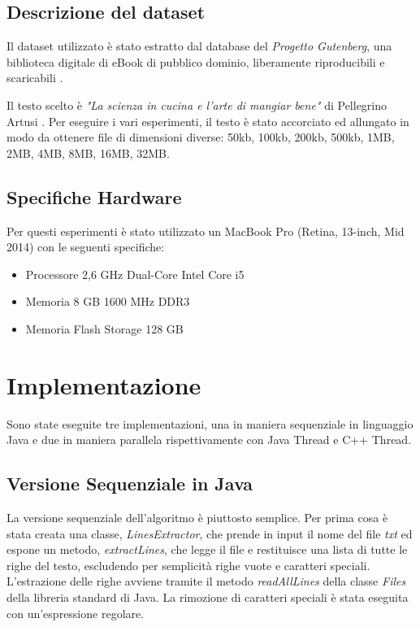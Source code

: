 \documentclass[10pt,twocolumn,letterpaper]{article}
\begin{document}
\subsection{Descrizione del dataset}
Il dataset utilizzato è stato estratto dal database del \textit{Progetto Gutenberg}, una biblioteca digitale di eBook di pubblico dominio, liberamente riproducibili e scaricabili \cite{GUTENBERG}. 

Il testo scelto è \textit{"La scienza in cucina e l'arte di mangiar bene"} di Pellegrino Artusi \cite{ARTUSI}. Per eseguire i vari esperimenti, il testo è stato accorciato ed allungato in modo da ottenere file di dimensioni diverse: 50kb, 100kb, 200kb, 500kb, 1MB, 2MB, 4MB, 8MB, 16MB, 32MB.

\subsection{Specifiche Hardware}
Per questi esperimenti è stato utilizzato un MacBook Pro (Retina, 13-inch, Mid 2014) con le seguenti specifiche:
\begin{itemize}
	\item Processore 2,6 GHz Dual-Core Intel Core i5
	\item Memoria 8 GB 1600 MHz DDR3
	\item Memoria Flash Storage 128 GB
\end{itemize}

\section{Implementazione}
Sono state eseguite tre implementazioni, una in maniera sequenziale in linguaggio Java e due in maniera parallela rispettivamente con Java Thread e C++ Thread.

\subsection{Versione Sequenziale in Java}
La versione sequenziale dell'algoritmo è piuttosto semplice. Per prima cosa è stata creata una classe, \textit{LinesExtractor}, che prende in input il nome del file \textit{txt} ed espone un metodo, \textit{extractLines}, che legge il file e restituisce una lista di tutte le righe del testo, escludendo per semplicità righe vuote e caratteri speciali. L'estrazione delle righe avviene tramite il metodo \textit{readAllLines} della classe \textit{Files} della libreria standard di Java. La rimozione di caratteri speciali è stata eseguita con un'espressione regolare.\newline
\end{document}
